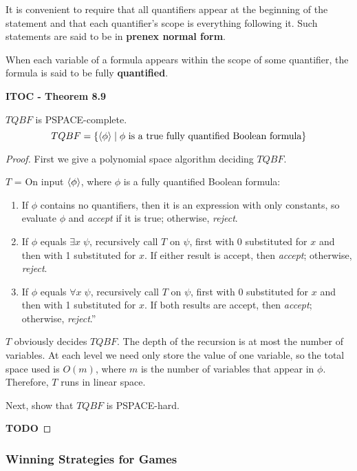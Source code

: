 It is convenient to require that all quantifiers appear at the beginning of the statement and that each quantifier’s scope is everything following it. Such statements are said to be in \textbf{prenex normal form}.

When each variable of a formula appears within the scope of some quantifier, the formula is said to be fully \textbf{quantified}.

\label{lang:TQBF_PSPACE}
\label{lang:TQBF_PSPACEC}
\begin{shaded}
\textbf{ITOC - Theorem 8.9}

\medskip
$TQBF$ is PSPACE-complete.
\[
TQBF = \{\langle{\phi}\rangle  \mid \text{$\phi$ is a true fully quantified Boolean formula}\}
\]
\end{shaded}

\begin{mdframed}
\begin{proof}
First we give a polynomial space algorithm deciding $TQBF$.

\medskip
$T$ = On input $\langle{\phi}\rangle$, where $\phi$ is a fully quantified Boolean formula:
\begin{enumerate}
\item If $\phi$ contains no quantifiers, then it is an expression with only constants, so evaluate $\phi$ and \textit{accept} if it is true; otherwise, \textit{reject}.
\item If $\phi$ equals $\exists x \; \psi$, recursively call $T$ on $\psi$, first with 0 substituted for $x$ and then with 1 substituted for $x$. If either result is accept, then \textit{accept}; otherwise, \textit{reject}.
\item If $\phi$ equals $\forall x \; \psi$, recursively call $T$ on $\psi$, first with 0 substituted for $x$ and then with 1 substituted for $x$. If both results are accept, then \textit{accept}; otherwise, \textit{reject}.”
\end{enumerate}

$T$ obviously decides $TQBF$. The depth of the recursion is at most the number of variables. At each level we need only store the value of one variable, so the total space used is $O(m)$, where $m$ is the number of variables that appear in $\phi$. Therefore, $T$ runs in linear space.

\medskip
Next, show that $TQBF$ is PSPACE-hard.

\textbf{TODO}
\end{proof}
\end{mdframed}

\subsubsection{Winning Strategies for Games}

